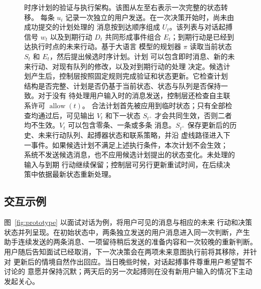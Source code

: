 \documentclass[manuscript,nonacm]{acmart}
\begin{document}
\begin{figure}[t]
  \centering
  \resizebox{0.98\textwidth}{!}{}
  \caption{时序计划的验证与执行架构。该图从左至右表示一次完整的状态转移。
  每条 $u_i$ 记录一次独立的用户发送。在一次决策开始时，尚未由成功提交的计划处理的
  消息按到达顺序组成 $U_t$。该列表与对话起搏信号 $w_t$ 以及到期行动 $D_t$
  共同形成事件组合 $E_t$；到期行动是已经到达执行时点的未来行动。基于大语言
  模型的规划器 $\pi$ 读取当前状态 $S_t$ 和 $E_t$，然后提出候选时序计划。计划
  可以包含即时消息、新的未来行动、对现有队列的修改，以及对到期行动的处理
  决定。候选计划产生后，控制层按照固定规则完成验证和状态更新。它检查计划
  结构是否完整、计划是否仍基于当前状态、状态与队列是否保持一致。对于没有
  待处理用户输入时的消息发送，控制层还检查自主联系许可 $\operatorname{allow}(t)$。
  合法计划首先被应用到临时状态；只有全部检查均通过后，可见输出 $V_t$ 和下一状态
  $S_{t^+}$ 才会共同生效，否则二者均不生效。$V_t$ 可以包含零条、一条或多条
  消息。$S_{t^+}$ 保存更新后的历史、未来行动队列、起搏器状态和联系策略，并沿
  虚线路径进入下一事件。如果候选计划不满足上述执行条件，本次计划不会生效；
  系统不发送候选消息，也不应用候选计划提出的状态变化。未处理的输入与到期
  行动继续保留；控制层可另行更新重试时间，在后续决策中依据最新状态重新处理。}
  \label{fig:architecture}
\end{figure}

\subsection{交互示例}

图~\ref{fig:prototype} 以面试对话为例，将用户可见的消息与相应的未来
行动和决策状态并列呈现。在初始状态中，两条独立发送的用户消息进入同一次判断，产生
助手连续发送的两条消息、一项留待稍后发送的准备内容和一次较晚的重新判断。
用户随后告知面试已经取消，下一次决策会在两项未来意图执行前将其移除，并针对
更新后的情境自然作出回应。当日晚些时候，对话起搏事件尊重用户希望暂不讨论的
意愿并保持沉默；两天后的另一次起搏则在没有新用户输入的情况下主动发起关心。
\end{document}

